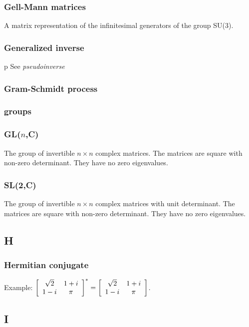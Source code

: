 \subsubsection*{Gell-Mann matrices}
A matrix representation of the infinitesimal generators of the group SU(3).

\subsubsection*{Generalized inverse}p
See {\it pseudoinverse}

\subsubsection*{Gram-Schmidt process}

\subsubsection*{groups}

\subsubsection*{\textbf{GL}($n$,\textbf{C})}
The group of invertible $n \times n$ complex matrices. The matrices are square with non-zero determinant. They have no zero eigenvalues.

\subsubsection*{\textbf{SL}(2,\textbf{C})}
The group of invertible $n \times n$ complex matrices with unit determinant. The matrices are square with non-zero determinant. They have no zero eigenvalues.

\subsection*{H} 

\subsubsection*{Hermitian conjugate}
Example: $\mat{cc}{\sqrt{2}&1+i\\1-i&\pi}^{*}=\mat{cc}{\sqrt{2}&1+i\\1-i&\pi}$.

\subsection*{I} 

